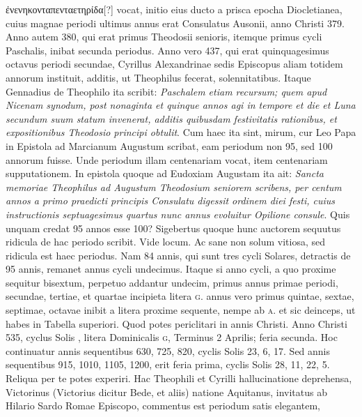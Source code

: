  \textgreek{ἐνενηκονταπενταετηρίδα[?]}
vocat, initio eius ducto a prisca epocha Diocletianea, cuius magnae
periodi ultimus annus erat Consulatus Ausonii, anno Christi 379.
Anno autem 380, qui erat primus Theodosii senioris, itemque primus
cycli Paschalis, inibat secunda periodus.
Anno vero 437, qui
erat quinquagesimus octavus periodi secundae, Cyrillus Alexandrinae
sedis Episcopus aliam totidem annorum instituit, additis, ut
Theophilus fecerat, solennitatibus.
Itaque Gennadius de Theophilo
ita scribit: \textit{Paschalem etiam recursum; quem apud Nicenam synodum,
post nonaginta et quinque annos agi in tempore et die et Luna
secundum suum statum invenerat, additis quibusdam festivitatis
rationibus, et expositionibus Theodosio principi obtulit}.
Cum haec ita
sint, mirum, cur Leo Papa in Epistola ad Marcianum Augustum
scribat, eam periodum non 95, sed 100 annorum fuisse.
Unde periodum
illam centenariam vocat, item centenariam supputationem.
In epistola quoque  ad Eudoxiam Augustam ita ait:
 \textit{Sancta
memoriae Theophilus ad Augustum Theodosium seniorem scribens, per centum
annos a primo praedicti principis Consulatu digessit ordinem diei festi,
cuius instructionis septuagesimus quartus nunc annus evoluitur Opilione
consule}.
Quis unquam credat 95 annos esse 100?
Sigebertus
quoque hunc auctorem sequutus ridicula de hac periodo scribit.
Vide locum.
Ac sane non solum vitiosa, sed ridicula est haec periodus.
Nam 84 annis, qui sunt tres cycli Solares, detractis de 95 annis,
remanet annus cycli undecimus.
Itaque si anno  cycli, a quo
proxime sequitur bisextum, perpetuo addantur undecim, primus annus
primae periodi, secundae, tertiae, et quartae incipieta litera \textsc{g}.
 annus
vero primus quintae, sextae, septimae, octavae inibit a litera proxime
sequente, nempe ab \textsc{a}. et sic deinceps, ut habes in Tabella
superiori.
%
Quod potes periclitari in annis Christi.
Anno Christi 535,
cyclus Solis , litera Dominicalis \textsc{g}, Terminus 2 Aprilis;
 feria secunda.
Hoc continuatur annis sequentibus 630, 725, 820, cyclis
Solis 23, 6, 17.
Sed annis sequentibus 915, 1010, 1105, 1200, erit
feria prima, cyclis Solis 28, 11, 22, 5.
Reliqua per te potes experiri.
Hac Theophili et Cyrilli hallucinatione deprehensa, Victorinus
(Victorius dicitur Bede, et aliis) natione Aquitanus, invitatus ab
Hilario Sardo Romae Episcopo, commentus est periodum satis elegantem,
